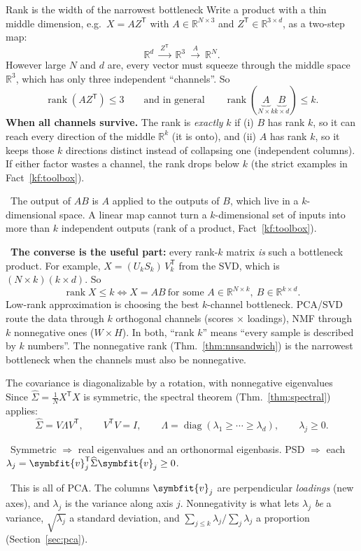 \documentclass[11pt]{article}
\newcommand{\bm}[1]{\symbfit{#1}}
\newcounter{keyfact}
\newcommand{\why}{\par\smallskip{\color{intgreen}\textbf{Why.}}\ }
\newcommand{\sowhat}{\par\smallskip{\color{corpurple}\textbf{So what.}}\ }
\newcommand{\R}{\mathbb{R}}
\newcommand{\Sig}{\widehat{\Sigma}}
\newcommand{\T}{^{\mathsf T}}
\newcommand{\rank}{\operatorname{rank}}
\newcommand{\diag}{\operatorname{diag}}
\begin{document}
\begin{keyfactbox}{Rank is the width of the narrowest bottleneck}\label{kf:bottleneck}
Write a product with a thin middle dimension, e.g.\ $X=AZ\T$ with $A\in\R^{N\times3}$ and $Z\T\in\R^{3\times d}$, as a two-step map:
\[
\R^d\ \xrightarrow{\ Z\T\ }\ \R^{3}\ \xrightarrow{\ A\ }\ \R^N .
\]
However large $N$ and $d$ are, every vector must squeeze through the middle space $\R^3$, which has only three
independent ``channels''. So
\[
\boxed{\rank(AZ\T)\le3}\qquad\text{and in general}\qquad \rank(\underbrace{A}_{N\times k}\underbrace{B}_{k\times d})\le k .
\]
\textbf{When all channels survive.} The rank is \emph{exactly} $k$ if (i) $B$ has rank $k$, so it can reach every direction of the
middle $\R^k$ (it is onto), and (ii) $A$ has rank $k$, so it keeps those $k$ directions distinct instead of collapsing one
(independent columns). If either factor wastes a channel, the rank drops below $k$ (the strict examples in Fact~\ref{kf:toolbox}).
\why The output of $AB$ is $A$ applied to the outputs of $B$, which live in a $k$-dimensional space. A linear map
cannot turn a $k$-dimensional set of inputs into more than $k$ independent outputs (rank of a product, Fact~\ref{kf:toolbox}).
\sowhat \textbf{The converse is the useful part:} every rank-$k$ matrix \emph{is} such a bottleneck product. For example,
$X=(U_kS_k)\,V_k\T$ from the SVD, which is $(N\times k)(k\times d)$. So
\[
\rank X\le k\iff X=AB\ \text{for some }A\in\R^{N\times k},\ B\in\R^{k\times d}.
\]
Low-rank approximation is choosing the best $k$-channel bottleneck. PCA/SVD route the data through $k$ orthogonal
channels (scores $\times$ loadings), NMF through $k$ nonnegative ones ($W\times H$). In both, ``rank $k$'' means ``every sample is
described by $k$ numbers''. The nonnegative rank (Thm.~\ref{thm:nnsandwich}) is the narrowest bottleneck
when the channels must also be nonnegative.
\end{keyfactbox}

\begin{keyfactbox}{The covariance is diagonalizable by a rotation, with nonnegative eigenvalues}
Since $\Sig=\tfrac1NX\T X$ is symmetric, the spectral theorem (Thm.~\ref{thm:spectral}) applies:
\[
\Sig=V\Lambda V\T,\qquad V\T V=I,\qquad \Lambda=\diag(\lambda_1\ge\cdots\ge\lambda_d),\qquad \lambda_j\ge0 .
\]
\why Symmetric $\Rightarrow$ real eigenvalues and an orthonormal eigenbasis. PSD $\Rightarrow$ each
$\lambda_j=\bm v_j\T\Sig\bm v_j\ge0$.
\sowhat This is all of PCA. The columns $\bm v_j$ are perpendicular \emph{loadings} (new axes), and
$\lambda_j$ is the variance along axis $j$. Nonnegativity is what lets $\lambda_j$ \emph{be} a variance,
$\sqrt{\lambda_j}$ a standard deviation, and $\sum_{j\le k}\lambda_j/\sum_j\lambda_j$ a proportion
(Section~\ref{sec:pca}).
\end{keyfactbox}
\end{document}
